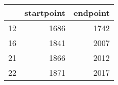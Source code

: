 % 
\begin{tabular}{rrr}
  \hline
 & startpoint & endpoint \\ 
  \hline
12 & 1686 & 1742 \\ 
  16 & 1841 & 2007 \\ 
  21 & 1866 & 2012 \\ 
  22 & 1871 & 2017 \\ 
   \hline
\end{tabular}
